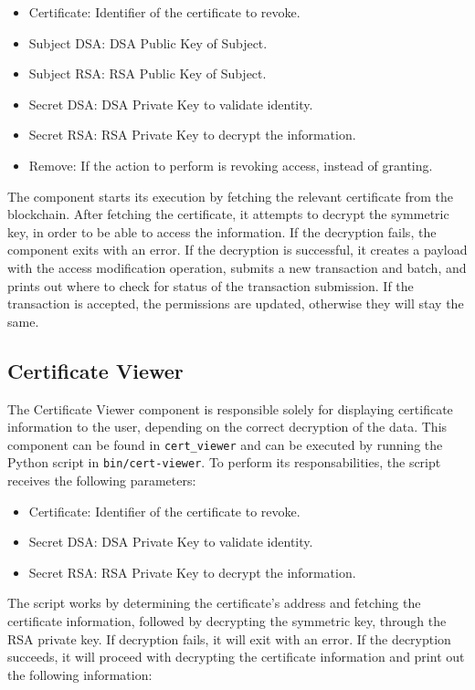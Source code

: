 \begin{itemize}
	\item Certificate: Identifier of the certificate to revoke.
	\item Subject DSA: DSA Public Key of Subject.
	\item Subject RSA: RSA Public Key of Subject.
	\item Secret DSA: DSA Private Key to validate identity.
	\item Secret RSA: RSA Private Key to decrypt the information.
	\item Remove: If the action to perform is revoking access, instead of granting.
\end{itemize}

The component starts its execution by fetching the relevant certificate from the blockchain. After fetching the certificate, it attempts to decrypt the symmetric key, in order to be able to access the information. If the decryption fails, the component exits with an error. If the decryption is successful, it creates a payload with the access modification operation, submits a new transaction and batch, and prints out where to check for status of the transaction submission. If the transaction is accepted, the permissions are updated, otherwise they will stay the same.

\subsection{Certificate Viewer}

The Certificate Viewer component is responsible solely for displaying certificate information to the user, depending on the correct decryption of the data.  This component can be found in \texttt{cert\_viewer} and can be executed by running the Python script in \texttt{bin/cert-viewer}. To perform its responsabilities, the script receives the following parameters:

\begin{itemize}
	\item Certificate: Identifier of the certificate to revoke.
	\item Secret DSA: DSA Private Key to validate identity.
	\item Secret RSA: RSA Private Key to decrypt the information.
\end{itemize}

The script works by determining the certificate's address and fetching the certificate information, followed by decrypting the symmetric key, through the RSA private key. If decryption fails, it will exit with an error. If the decryption succeeds, it will proceed with decrypting the certificate information and print out the following information:

